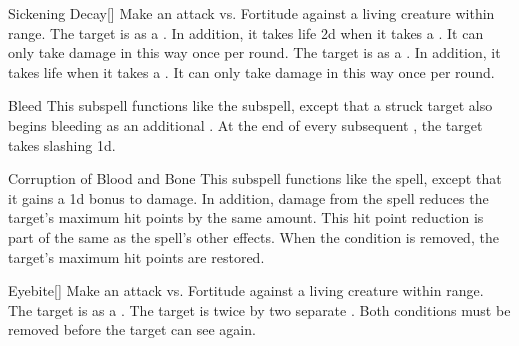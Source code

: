 \begin{ability}[\nth{1}]{Sickening Decay}[]
Make an attack vs. Fortitude against a living creature within \rngclose range.
\hit The target is  as a .
In addition, it takes life  \minus2d when it takes a .
It can only take damage in this way once per round.
\crit The target is  as a .
In addition, it takes life  when it takes a .
It can only take damage in this way once per round.
\end{ability}
\vspace{0.25em}



\begin{ability}[\nth{3}]{Bleed}
This subspell functions like the  subspell, except that a struck target also begins bleeding as an additional .
At the end of every subsequent , the target takes slashing  \minus1d.
\end{ability}
\vspace{0.25em}



\begin{ability}[\nth{3}]{Corruption of Blood and Bone}
This subspell functions like the  spell, except that it gains a \plus1d bonus to damage.
In addition, damage from the spell reduces the target's maximum hit points by the same amount.
This hit point reduction is part of the same  as the spell's other effects.
When the condition is removed, the target's maximum hit points are restored.
\end{ability}
\vspace{0.25em}



\begin{ability}[\nth{3}]{Eyebite}[]
Make an attack vs. Fortitude against a living creature within \rngclose range.
\hit The target is  as a .
\crit The target is  twice by two separate .
Both conditions must be removed before the target can see again.
\end{ability}
\vspace{0.25em}



